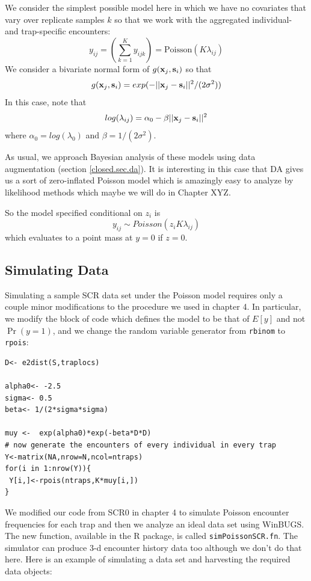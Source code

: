 We consider the simplest possible model here in which we have no
covariates that vary over replicate samples $k$ so that we work with
the aggregated individual- and trap-specific encounters:
\[
y_{ij} = (\sum_{k=1}^{K} y_{ijk}) =  \mbox{Poisson}(K  \lambda_{ij})
\]
We consider a bivariate normal form of $g({\bf x}_{j},{\bf s}_{i})$ so
that
\[
g({\bf x}_{j},{\bf s}_{i}) = exp( -||{\bf x}_{j} - {\bf
  s}_{i}||^{2} /(2\sigma^{2}))
\]
In this case, note that 
\[
log( \lambda_{ij})  =\alpha_{0} - \beta ||{\bf x}_{j} - {\bf s}_{i}||^2
\]
where $\alpha_{0} = log(\lambda_{0})$ and $\beta = 1/(2\sigma^2)$.


As usual, we approach Bayesian analysis of these
models using data augmentation (section \ref{closed.sec.da}). 
It is interesting in this case that DA
gives us a sort of zero-inflated Poisson model which is amazingly easy
to analyze by likelihood methods which maybe we will do in Chapter
XYZ.

So the model specified conditional on $z_{i}$ is
\[
y_{ij} \sim  Poisson(z_{i} K  \lambda_{ij})
\]
which evaluates to a point mass at $y=0$ if $z=0$. 


\subsection{Simulating Data}

Simulating a sample SCR data set under the Poisson model requires only
a couple minor modifications to the procedure we used in chapter 4. In
particular, we modify the block of code which defines the model to be
that of $E[y]$ and not $\Pr(y=1)$, and we change the random variable
generator from \mbox{\tt rbinom} to \mbox{\tt rpois}:
\begin{verbatim}
D<- e2dist(S,traplocs)

alpha0<- -2.5
sigma<- 0.5
beta<- 1/(2*sigma*sigma)

muy <-  exp(alpha0)*exp(-beta*D*D)
# now generate the encounters of every individual in every trap
Y<-matrix(NA,nrow=N,ncol=ntraps)
for(i in 1:nrow(Y)){
 Y[i,]<-rpois(ntraps,K*muy[i,])
}
\end{verbatim}

We modified our code from SCR0 in chapter 4 to simulate Poisson
encounter frequencies for each trap and then we analyze an ideal data
set using WinBUGS. The new function, available in the R package, is called
{\tt simPoissonSCR.fn}. 
The simulator can produce 3-d encounter history data too although we
don't do that here. 
Here is an example of simulating a data set and harvesting the
required data objects:

